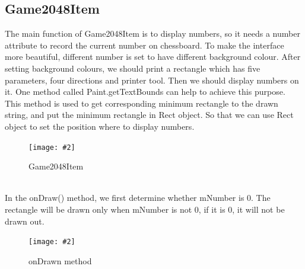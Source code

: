 \documentclass[10pt, a4paper]{article}
\newcommand{\figuremacro}[5]{
    \begin{figure}[#1]
        \centering
        \texttt{[image: \#2]}
        \caption[#3]{\textbf{#3}#4}
        \label{fig:#2}
    \end{figure}
}
\begin{document}
	\subsection{Game2048Item}
	 The  main function of Game2048Item is to display numbers, so it needs a number attribute to record the current number on chessboard. To make the interface more beautiful, different number is set to have different background colour. After setting background colours, we should print a rectangle which has five parameters, four directions and printer tool. Then we should display numbers on it. One method called Paint.getTextBounds can help to achieve this purpose. This method is used to get corresponding minimum rectangle to the drawn string, and put the minimum rectangle in Rect object. So that we can use Rect object to set the position where to display numbers.
     \figuremacro{h}{1.JPG}{}{Game2048Item}{1.0}\\
	 In the onDraw() method, we first determine whether mNumber is 0. The rectangle will be drawn only when mNumber is not 0, if it is 0, it will not be drawn out.
	 \figuremacro{h}{2.JPG}{}{onDrawn method}{1.0}
	  
	 
\end{document}
